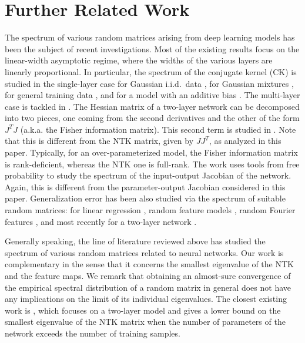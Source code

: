 \documentclass[11pt]{article}
\begin{document}
\section{Further Related Work}\label{sec:related_work}
The spectrum of various random matrices arising from deep learning models has been the subject of recent investigations.
Most of the existing results focus on the linear-width asymptotic regime,
where the widths of the various layers are linearly proportional. 
In particular, the spectrum of the conjugate kernel (CK) is studied in the single-layer case for Gaussian i.i.d.\ data \citep{pennington2017nonlinear}, 
for Gaussian mixtures \citep{liao2018spectrum}, for general training data \citep{louart2018random}, 
and for a model with an additive bias \citep{adlam2019random}.
The multi-layer case is tackled in \citep{benigni2019eigenvalue}. 
The Hessian matrix of a two-layer network can be decomposed into two pieces, 
one coming from the second derivatives and the other of the form $J^TJ$ (a.k.a. the Fisher information matrix).
This second term is studied in \citep{pennington2017geometry,pennington2018spectrum}. 
Note that this is different from the NTK matrix, given by $JJ^T$, as analyzed in this paper.
Typically, for an over-parameterized model, the Fisher information matrix is rank-deficient, whereas the NTK one is full-rank.
The work \citep{pennington2018emergence} uses tools from free probability to study the spectrum of the input-output Jacobian of the network.
Again, this is different from the parameter-output Jacobian considered in this paper.
Generalization error has been also studied via the spectrum of suitable random matrices: for linear regression \citep{hastie2019surprises}, 
random feature models \citep{mei2019generalization}, random Fourier features \citep{liao2020random}, 
and most recently for a two-layer network \citep{Andrea2020}.
    
Generally speaking, the line of literature reviewed above has studied the spectrum of various random matrices 
related to neural networks. Our work is complementary
in the sense that it concerns the smallest eigenvalue of the NTK and the feature maps. 
We remark that obtaining an almost-sure convergence of the empirical spectral distribution of a random matrix in general
does not have any implications on the limit of its individual eigenvalues. 
The closest existing work is \citep{Andrea2020}, 
which focuses on a two-layer model and gives a lower bound on the smallest eigenvalue of the NTK matrix when the number of parameters of the network exceeds the number of training samples.
\end{document}
